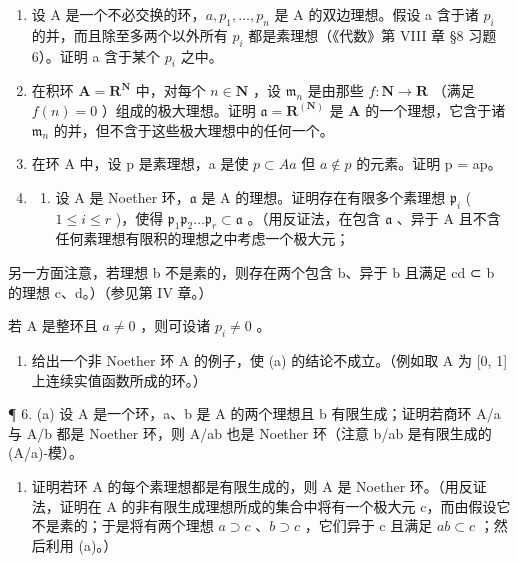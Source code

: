 \begin{enumerate}
\def\labelenumi{\arabic{enumi}.}
\setcounter{enumi}{1}
\item
  设 A 是一个不必交换的环，\(a, p_{1}, \ldots, p_{n}\) 是 A 的双边理想。假设 a 含于诸 \(p_{i}\) 的并，而且除至多两个以外所有 \(p_{i}\) 都是素理想（《代数》第 VIII 章 §8 习题 6）。证明 a 含于某个 \(p_{i}\) 之中。
\item
  在积环 \(\mathbf{A} = \mathbf{R}^{\mathbf{N}}\) 中，对每个 \(n \in \mathbf{N}\) ，设 \(\mathfrak{m}_n\) 是由那些 \(f\colon \mathbf{N} \to \mathbf{R}\) （满足 \(f(n) = 0\) ）组成的极大理想。证明 \(\mathfrak{a} = \mathbf{R}^{(\mathbf{N})}\) 是 \(\mathbf{A}\) 的一个理想，它含于诸 \(\mathfrak{m}_n\) 的并，但不含于这些极大理想中的任何一个。
\item
  在环 A 中，设 p 是素理想，a 是使 \(p \subset Aa\) 但 \(a \notin p\) 的元素。证明 p = ap。
\item
  \begin{enumerate}
  \def\labelenumii{(\alph{enumii})}
  \tightlist
  \item
    设 A 是 Noether 环，\(\mathfrak{a}\) 是 A 的理想。证明存在有限多个素理想 \(\mathfrak{p}_i\) ( \(1 \leqslant i \leqslant r\) )，使得 \(\mathfrak{p}_1\mathfrak{p}_2 \ldots \mathfrak{p}_r \subset \mathfrak{a}\) 。（用反证法，在包含 \(\mathfrak{a}\) 、异于 A 且不含任何素理想有限积的理想之中考虑一个极大元；
  \end{enumerate}
\end{enumerate}

另一方面注意，若理想 b 不是素的，则存在两个包含 b、异于 b 且满足 cd ⊂ b 的理想 c、d。）（参见第 IV 章。）

若 A 是整环且 \(a \neq 0\) ，则可设诸 \(p_{i} \neq 0\) 。

\begin{enumerate}
\def\labelenumi{(\alph{enumi})}
\setcounter{enumi}{1}
\tightlist
\item
  给出一个非 Noether 环 A 的例子，使 (a) 的结论不成立。（例如取 A 为 {[}0, 1{]} 上连续实值函数所成的环。）
\end{enumerate}

¶ 6. (a) 设 A 是一个环，a、b 是 A 的两个理想且 b 有限生成；证明若商环 A/a 与 A/b 都是 Noether 环，则 A/ab 也是 Noether 环（注意 b/ab 是有限生成的 (A/a)-模）。

\begin{enumerate}
\def\labelenumi{(\alph{enumi})}
\setcounter{enumi}{1}
\tightlist
\item
  证明若环 A 的每个素理想都是有限生成的，则 A 是 Noether 环。（用反证法，证明在 A 的非有限生成理想所成的集合中将有一个极大元 c，而由假设它不是素的；于是将有两个理想 \(a \supset c\) 、\(b \supset c\) ，它们异于 c 且满足 \(ab \subset c\) ；然后利用 (a)。）
\end{enumerate}

